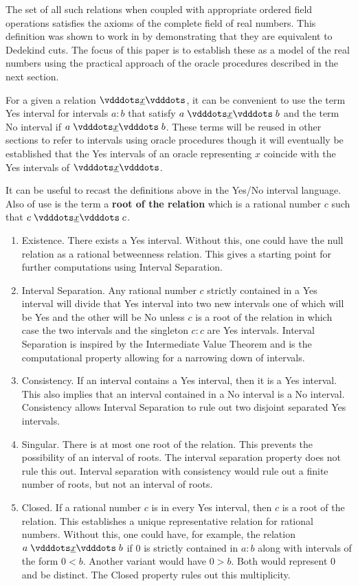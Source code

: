 \documentclass[12pt]{article}
\begin{document}
The set of all such relations when coupled with appropriate ordered field operations satisfies the axioms of the complete field of real numbers. This definition was shown to work in \cite{taylor24dedekind} by demonstrating that they are equivalent to Dedekind cuts. The focus of this paper is to establish these as a model of the real numbers using the practical approach of the oracle procedures described in the next section. 

For a given a relation $\xrel$, it can be convenient to use the term Yes interval for intervals $a:b$ that satisfy $a \xrel b$ and the term No interval if \sout{$ a \xrel b$}. These terms will be reused in other sections to refer to intervals using oracle procedures though it will eventually be established that the Yes intervals of an oracle representing $x$ coincide with the Yes intervals of $\xrel$.

It can be useful to recast the definitions above in the Yes/No interval language. Also of use is the term a \textbf{root of the relation} which is a rational number $c$ such that $c \xrel c$.

\begin{enumerate}
    \item Existence. There exists a Yes interval. Without this, one could have the null relation as a rational betweenness relation. This gives a starting point for further computations using Interval Separation. 
    \item Interval Separation. Any rational number $c$ strictly contained in a Yes interval will divide that Yes interval into two new intervals one of which will be Yes and the other will be No unless $c$ is a root of the relation in which case the two intervals and the singleton $c:c$ are Yes intervals. Interval Separation is inspired by the Intermediate Value Theorem and is the computational property allowing for a narrowing down of intervals. 
    \item Consistency. If an interval contains a Yes interval, then it is a Yes interval. This also implies that an interval contained in a No interval is a No interval. Consistency allows Interval Separation to rule out two disjoint separated Yes intervals. 
    \item Singular. There is at most one root of the relation. This prevents the possibility of an interval of roots. The interval separation property does not rule this out. Interval separation with consistency would rule out a finite number of roots, but not an interval of roots.  
    \item Closed. If a rational number $c$ is in every Yes interval, then $c$ is a root of the relation. This establishes a unique representative relation for rational numbers. Without this, one could have, for example, the relation $ a \xrel b$ if 0 is strictly contained in $a:b$ along with intervals of the form $0 < b$. Another variant would have $0 > b$. Both would represent 0 and be distinct. The Closed property rules out this multiplicity. 
\end{enumerate}
\end{document}
